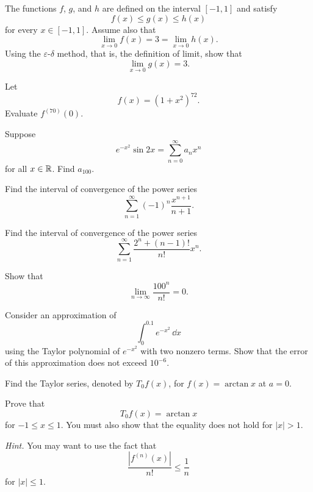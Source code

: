 \begin{problem}
The functions $f$, $g$, and $h$ are defined on the interval $[-1, 1]$ and satisfy
\[
f(x)\le g(x)\le h(x)
\]
for every $x\in[-1, 1]$. Assume also that
\[
\lim_{x\to0}f(x)=3=\lim_{x\to0}h(x).
\]
Using the $\varepsilon$-$\delta$ method, that is, the definition of limit, show that
\[
\lim_{x\to0}g(x)=3.
\]
\end{problem}

\begin{problem}
Let
\[
f(x)=(1+x^2)^{72}.
\]
Evaluate $f^{(70)}(0)$.
\end{problem}

\begin{problem}
Suppose
\[
e^{-x^2}\sin 2x=\sum_{n=0}^{\infty}a_nx^n
\]
for all $x\in\mathbb{R}$. Find $a_{100}$.
\end{problem}

\begin{problem}
Find the interval of convergence of the power series
\[
\sum_{n=1}^{\infty}(-1)^n\frac{x^{n+1}}{n+1}.
\]
\end{problem}

\begin{problem}
Find the interval of convergence of the power series
\[
\sum_{n=1}^{\infty}
\frac{2^n+(n-1)!}{n!}x^n.
\]
\end{problem}

\begin{problem}
Show that
\[
\lim_{n\to\infty}\frac{100^n}{n!}=0.
\]
\end{problem}

\begin{problem}
Consider an approximation of
\[
\int_0^{0.1}e^{-x^2}\,\dd x
\]
using the Taylor polynomial of $e^{-x^2}$ with two nonzero terms. Show that the error of this approximation does not exceed $10^{-6}$.
\end{problem}

\begin{problem}
\begin{problemsubparts}
\item Find the Taylor series, denoted by $T_0f(x)$, for $f(x)=\arctan x$ at $a=0$.
\item Prove that
\[
T_0f(x)=\arctan x
\]
for $-1\le x\le1$. You must also show that the equality does not hold for $|x|>1$.

\textit{Hint.} You may want to use the fact that
\[
\frac{|f^{(n)}(x)|}{n!}\le\frac1n
\]
for $|x|\le1$.
\end{problemsubparts}
\end{problem}

